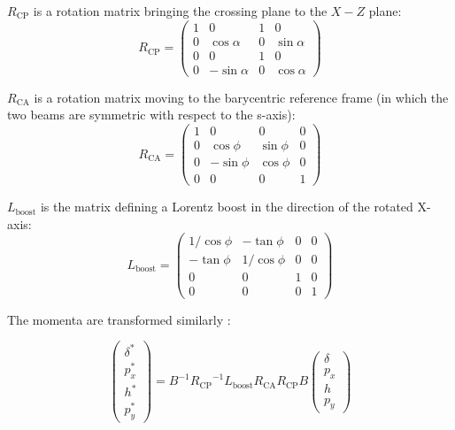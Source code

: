\begin{appendices}
$R_{\mathrm{CP}}$ is a rotation matrix bringing the crossing plane to the $X-Z$ plane:
\begin{equation}
R_{\mathrm{CP}}=
\left( \begin{matrix}
1 &0 &1&0\\
0 &\cos\alpha &0&\sin\alpha\\
0 &0 &1&0\\
0 &-\sin\alpha &0&\cos\alpha
\end{matrix} \right) 
\end{equation}

$R_{\mathrm{CA}}$ is a rotation matrix moving to the barycentric reference frame (in which the two beams are symmetric with respect to the s-axis):
\begin{equation}
R_{\mathrm{CA}}=
\left( \begin{matrix}
1 &0 &0&0\\
0 &\cos\phi&\sin\phi &0\\
0 &-\sin\phi&\cos\phi &0\\
0 &0 &0&1
\end{matrix} \right) 
\end{equation}

$L_{\mathrm{boost}}$ is the matrix defining a Lorentz boost in the direction of the rotated X-axis:
\begin{equation}
L_{\mathrm{boost}}=
\left( \begin{matrix}
1/\cos\phi &-\tan\phi &0&0\\
-\tan\phi &1/\cos\phi&0 &0\\
0 &0&1 &0\\
0 &0 &0&1
\end{matrix} \right) 
\end{equation}

The momenta are transformed similarly \cite{refpaper}:

\begin{equation}
\left( \begin{matrix}
\delta^*\\
p_x^*\\
h^*\\
p_y^*
\end{matrix} \right) = 
B^{-1}{R_{\mathrm{CP}}}^{-1}L_{\mathrm{boost}}R_{\mathrm{CA}}R_{\mathrm{CP}}B
\left( \begin{matrix}
\delta\\
p_x\\
h\\
p_y
\end{matrix} \right) 
\end{equation}


\end{appendices}
